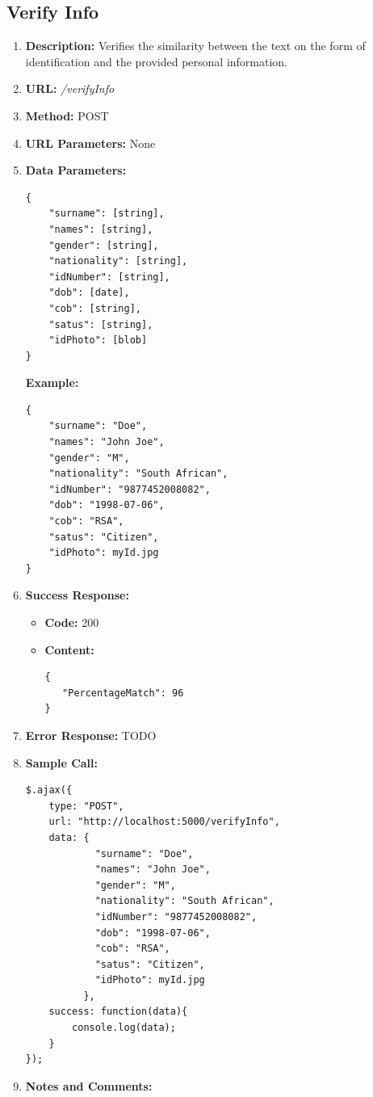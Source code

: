 \documentclass{article}
\begin{document}
\subsection{Verify Info}
\begin{enumerate}
	\item \textbf{Description:} Verifies the similarity between the text on the form of identification and the provided personal information.
	\item \textbf{URL:} \textit{/verifyInfo}
	\item \textbf{Method:} POST
	\item \textbf{URL Parameters:} None
	\item \textbf{Data Parameters:}

	\begin{lstlisting}
{
    "surname": [string],
    "names": [string],
    "gender": [string],
    "nationality": [string],
    "idNumber": [string],
    "dob": [date],
    "cob": [string],
    "satus": [string],
    "idPhoto": [blob]
}
	\end{lstlisting}

	\textbf{Example:}

	\begin{lstlisting}
{   
    "surname": "Doe",
    "names": "John Joe",
    "gender": "M",
    "nationality": "South African",
    "idNumber": "9877452008082",
    "dob": "1998-07-06",
    "cob": "RSA",
    "satus": "Citizen",
    "idPhoto": myId.jpg
}
	\end{lstlisting}
	
	\item \textbf{Success Response:} 
		\begin{itemize}
			\item \textbf{Code:} 200
			\item \textbf{Content:}
			\begin{lstlisting}
{
   "PercentageMatch": 96
}
			\end{lstlisting}
		\end{itemize}
		\item \textbf{Error Response:} TODO
		\item \textbf{Sample Call:}
		\begin{lstlisting}
$.ajax({
    type: "POST",
    url: "http://localhost:5000/verifyInfo",
    data: {
            "surname": "Doe",
            "names": "John Joe",
            "gender": "M",
            "nationality": "South African",
            "idNumber": "9877452008082",
            "dob": "1998-07-06",
            "cob": "RSA",
            "satus": "Citizen",
            "idPhoto": myId.jpg
          },
    success: function(data){
        console.log(data);
    }
});
		\end{lstlisting}
		\item \textbf{Notes and Comments:}
\end{enumerate}
\end{document}
